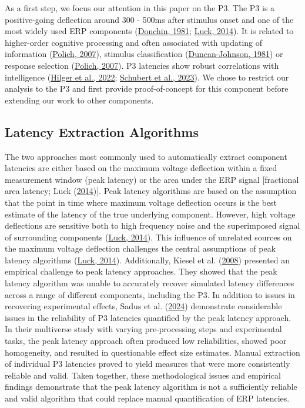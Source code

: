 \documentclass[
  man]{apa7}
\begin{document}
As a first step, we focus our attention in this paper on the P3. The P3 is a positive-going deflection around 300 - 500ms after stimulus onset and one of the most widely used ERP components (\protect\hyperlink{ref-donchin1981surprise}{Donchin, 1981}; \protect\hyperlink{ref-luck2014introduction}{Luck, 2014}). It is related to higher-order cognitive processing and often associated with updating of information (\protect\hyperlink{ref-polich2007updating}{Polich, 2007}), stimulus classification (\protect\hyperlink{ref-duncan1981young}{Duncan-Johnson, 1981}) or response selection (\protect\hyperlink{ref-polich2007updating}{Polich, 2007}). P3 latencies show robust correlations with intelligence (\protect\hyperlink{ref-hilger2022biological}{Hilger et al., 2022}; \protect\hyperlink{ref-schubert2023robust}{Schubert et al., 2023}). We chose to restrict our analysis to the P3 and first provide proof-of-concept for this component before extending our work to other components.

\hypertarget{latency-extraction-algorithms}{%
\subsection{Latency Extraction Algorithms}\label{latency-extraction-algorithms}}

The two approaches most commonly used to automatically extract component latencies are either based on the maximum voltage deflection within a fixed measurement window (peak latency) or the area under the ERP signal {[}fractional area latency; Luck (\protect\hyperlink{ref-luck2014introduction}{2014}){]}. Peak latency algorithms are based on the assumption that the point in time where maximum voltage deflection occurs is the best estimate of the latency of the true underlying component. However, high voltage deflections are sensitive both to high frequency noise and the superimposed signal of surrounding components (\protect\hyperlink{ref-luck2014introduction}{Luck, 2014}). This influence of unrelated sources on the maximum voltage deflection challenges the central assumptions of peak latency algorithms (\protect\hyperlink{ref-luck2014introduction}{Luck, 2014}). Additionally, Kiesel et al. (\protect\hyperlink{ref-kiesel2008measurement}{2008}) presented an empirical challenge to peak latency approaches. They showed that the peak latency algorithm was unable to accurately recover simulated latency differences across a range of different components, including the P3. In addition to issues in recovering experimental effects, Sadus et al. (\protect\hyperlink{ref-sadus2024explorative}{2024}) demonstrate considerable issues in the reliability of P3 latencies quantified by the peak latency approach. In their multiverse study with varying pre-processing steps and experimental tasks, the peak latency approach often produced low reliabilities, showed poor homogeneity, and resulted in questionable effect size estimates. Manual extraction of individual P3 latencies proved to yield measures that were more consistently reliable and valid. Taken together, these methodological issues and empirical findings demonstrate that the peak latency algorithm is not a sufficiently reliable and valid algorithm that could replace manual quantification of ERP latencies.
\end{document}
